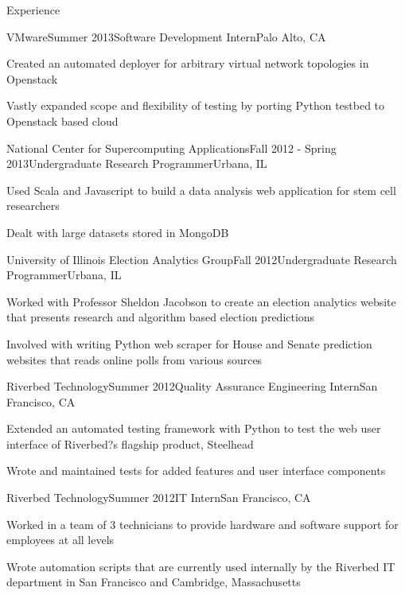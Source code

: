 \documentclass{resume} %
\begin{document}
\begin{rSection}{Experience}

\begin{rSubsection}{VMware}{Summer 2013}{Software Development Intern}{Palo Alto, CA}
\item Created an automated deployer for arbitrary virtual network topologies in Openstack
\item  Vastly expanded scope and flexibility of testing by porting Python testbed to Openstack based cloud
\end{rSubsection}


\begin{rSubsection}{National Center for Supercomputing Applications}{Fall 2012 - Spring 2013}{Undergraduate Research Programmer}{Urbana, IL}
\item Used Scala and Javascript to build a data analysis web application for stem cell researchers
\item Dealt with large datasets stored in MongoDB
\end{rSubsection}


\begin{rSubsection}{University of Illinois Election Analytics Group}{Fall 2012}{Undergraduate Research Programmer}{Urbana, IL}
\item Worked with Professor Sheldon Jacobson to create an election analytics website that presents research and algorithm based election predictions 
\item Involved with writing Python web scraper for House and Senate prediction websites that reads online polls from various sources
\end{rSubsection}

\begin{rSubsection}{Riverbed Technology}{Summer 2012}{Quality Assurance Engineering Intern}{San Francisco, CA}
\item Extended an automated testing framework with Python to test the web user interface of Riverbed?s flagship product, Steelhead 
\item Wrote and maintained tests for added features and user interface components
\end{rSubsection}

\begin{rSubsection}{Riverbed Technology}{Summer 2012}{IT Intern}{San Francisco, CA}
\item Worked in a team of 3 technicians to provide hardware and software support for employees at all levels 
\item Wrote automation scripts that are currently used internally by the Riverbed IT department in San Francisco and Cambridge, Massachusetts
\end{rSubsection}


\end{rSection}
\end{document}
